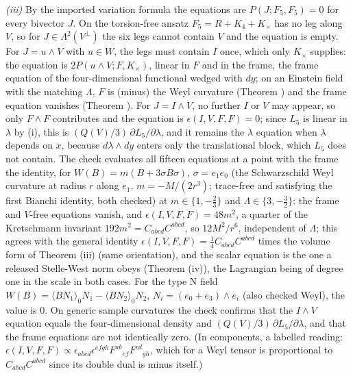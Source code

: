 \emph{(iii)} By the imported variation formula the equations are $P(J; F_{5}, F_{5}) = 0$ for every bivector $J$. On the torsion-free ansatz $F_{5} = R + K_{4} + K_{\times}$ has no leg along $V$, so for $J \in \Lambda^{2}(V^{\perp})$ the six legs cannot contain $V$ and the equation is empty. For $J = u\wedge V$ with $u \in W$, the legs must contain $I$ once, which only $K_{\times}$ supplies: the equation is $2P(u\wedge V; F, K_{\times})$, linear in $F$ and in the frame, the frame equation of the four-dimensional functional wedged with $dy$; on an Einstein field with the matching $\Lambda$, $F$ is (minus) the Weyl curvature (Theorem ) and the frame equation vanishes (Theorem ). For $J = I\wedge V$, no further $I$ or $V$ may appear, so only $F\wedge F$ contributes and the equation is $\epsilon(I, V, F, F) = 0$; since $L_{5}$ is linear in $\lambda$ by (i), this is $(Q(V)/3)\,\partial L_{5}/\partial\lambda$, and it remains the $\lambda$ equation when $\lambda$ depends on $x$, because $d\lambda\wedge dy$ enters only the translational block, which $L_{5}$ does not contain. The check evaluates all fifteen equations at a point with the frame the identity, for $W(B) = m(B + 3\sigma B\sigma)$, $\sigma = e_{1}e_{0}$ (the Schwarzschild Weyl curvature at radius $r$ along $e_{1}$, $m = -M/(2r^{3})$; trace-free and satisfying the first Bianchi identity, both checked) at $m \in \{1, -\tfrac23\}$ and $\Lambda \in \{3, -\tfrac32\}$: the frame and $V$-free equations vanish, and $\epsilon(I, V, F, F) = 48m^{2}$, a quarter of the Kretschmann invariant $192m^{2} = C_{abcd}C^{abcd}$, so $12M^{2}/r^{6}$, independent of $\Lambda$; this agrees with the general identity $\epsilon(I, V, F, F) = \tfrac14 C_{abcd}C^{abcd}$ times the volume form of Theorem (iii) (same orientation), and the scalar equation is the one a released Stelle-West norm obeys (Theorem (iv)), the Lagrangian being of degree one in the scale in both cases. For the type N field $W(B) = \langle BN_{1}\rangle_{0}N_{1} - \langle BN_{2}\rangle_{0}N_{2}$, $N_{i} = (e_{0} + e_{3})\wedge e_{i}$ (also checked Weyl), the value is $0$. On generic sample curvatures the check confirms that the $I\wedge V$ equation equals the four-dimensional density and $(Q(V)/3)\,\partial L_{5}/\partial\lambda$, and that the frame equations are not identically zero. (In components, a labelled reading: $\epsilon(I, V, F, F) \propto \epsilon_{abcd}\epsilon^{efgh}F^{ab}{}_{ef}F^{cd}{}_{gh}$, which for a Weyl tensor is proportional to $C_{abcd}C^{abcd}$ since its double dual is minus itself.)

